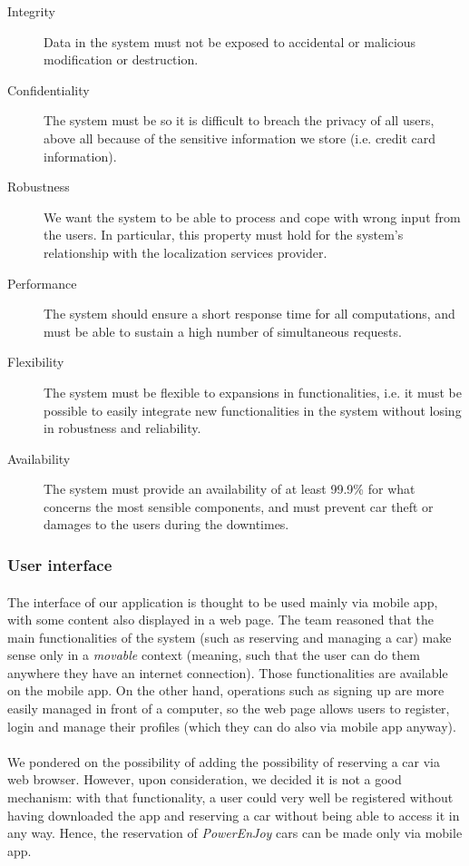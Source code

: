 	\begin{description}
		\item[Integrity] Data in the system must not be exposed to accidental or malicious modification or destruction.
		\item[Confidentiality] The system must be so it is difficult to breach the privacy of all users, above all because of the sensitive information we store (i.e. credit card information).
		\item[Robustness] We want the system to be able to process and cope with wrong input from the users. In particular, this property must hold for the system's relationship with the localization services provider. 
		\item[Performance] The system should ensure a short response time for all computations, and must be able to sustain a high number of simultaneous requests.
		\item[Flexibility] The system must be flexible to expansions in functionalities, i.e. it must be possible to easily integrate new functionalities in the system without losing in robustness and reliability.
		\item[Availability] The system must provide an availability of at least 99.9\% for what concerns the most sensible components, and must prevent car theft or damages to the users during the downtimes.
	\end{description}

	\subsubsection{User interface}
	\paragraph{}The interface of our application is thought to be used mainly via mobile app, with some content also displayed in a web page. The team reasoned that the main functionalities of the system (such as reserving and managing a car) make sense only in a \textit{movable} context (meaning, such that the user can do them anywhere they have an internet connection). Those functionalities are available on the mobile app. On the other hand, operations such as signing up are more easily managed in front of a computer, so the web page allows users to register, login and manage their profiles (which they can do also via mobile app anyway).
	\paragraph{}We pondered on the possibility of adding the possibility of reserving a car via web browser. However, upon consideration, we decided it is not a good mechanism: with that functionality, a user could very well be registered without having downloaded the app and reserving a car without being able to access it in any way. Hence, the reservation of \textit{PowerEnJoy} cars can be made only via mobile app. 
	
